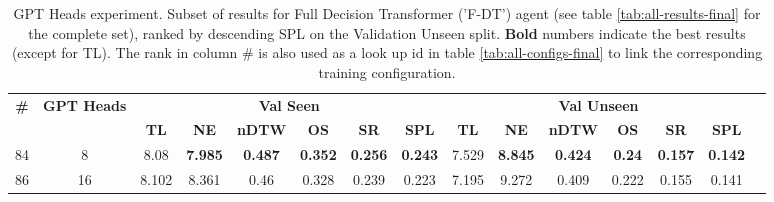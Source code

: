 \begin{table}
\centering
\caption{\label{tab:f_dt_heads}GPT Heads experiment. Subset of results for Full Decision Transformer ('F-DT') agent (see table \ref{tab:all-results-final} for the complete set), ranked by descending SPL on the Validation Unseen split. \textbf{Bold} numbers indicate the best results (except for TL). The rank in column \# is also used as a look up id in table \ref{tab:all-configs-final} to link the corresponding training configuration.}
\begin{tabular}{@{\hskip3pt}c@{\hskip3pt}c@{\hskip3pt}c@{\hskip3pt}c@{\hskip3pt}c@{\hskip3pt}c@{\hskip3pt}c@{\hskip3pt}c@{\hskip3pt}c@{\hskip3pt}c@{\hskip3pt}c@{\hskip3pt}c@{\hskip3pt}c@{\hskip3pt}c@{\hskip3pt}c}
\toprule
                                  \textbf{\#} & \textbf{GPT Heads} & \multicolumn{6}{c}{\textbf{Val Seen}} & \multicolumn{6}{c}{\textbf{Val Unseen}} \\
\cmidrule(l){3-8}\cmidrule(l){9-14}\textbf{~} &         \textbf{~} &       \textbf{TL} &     \textbf{NE} &   \textbf{nDTW} &     \textbf{OS} &     \textbf{SR} &    \textbf{SPL} &         \textbf{TL} &     \textbf{NE} &   \textbf{nDTW} &    \textbf{OS} &     \textbf{SR} &    \textbf{SPL} \\
\midrule
                                           84 &                  8 &              8.08 &  \textbf{7.985} &  \textbf{0.487} &  \textbf{0.352} &  \textbf{0.256} &  \textbf{0.243} &               7.529 &  \textbf{8.845} &  \textbf{0.424} &  \textbf{0.24} &  \textbf{0.157} &  \textbf{0.142} \\
                                           86 &                 16 &             8.102 &           8.361 &            0.46 &           0.328 &           0.239 &           0.223 &               7.195 &           9.272 &           0.409 &          0.222 &           0.155 &           0.141 \\
\bottomrule
\end{tabular}
\end{table}
